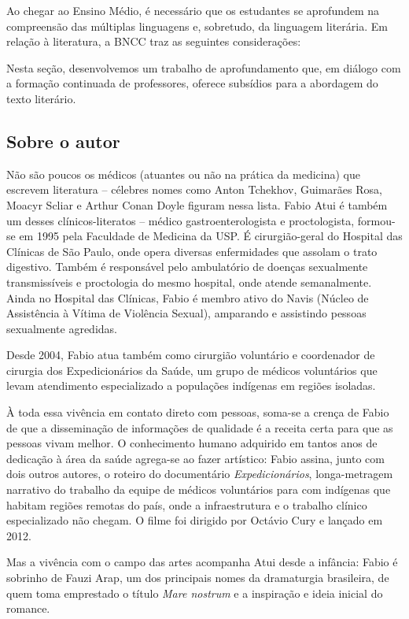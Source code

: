 \documentclass[12pt]{extarticle}
\begin{document}
Ao chegar ao Ensino Médio, é necessário que os estudantes se aprofundem na compreensão
das múltiplas linguagens e, sobretudo, da linguagem literária. Em relação à literatura, 
a BNCC traz as seguintes considerações:

Nesta seção, desenvolvemos um trabalho de aprofundamento que, em diálogo com a 
formação continuada de professores, oferece subsídios para a abordagem do texto literário.


\subsection{Sobre o autor}

Não são poucos os médicos (atuantes ou não na prática da medicina) que escrevem literatura – célebres nomes como Anton Tchekhov, Guimarães Rosa, Moacyr Scliar e Arthur Conan Doyle figuram nessa lista. Fabio Atui é também um desses clínicos-literatos – médico gastroenterologista e proctologista, formou-se em 1995 pela Faculdade de Medicina da USP. É cirurgião-geral do Hospital das Clínicas de São Paulo, onde opera diversas enfermidades que assolam o trato digestivo. Também é responsável pelo ambulatório de doenças sexualmente transmissíveis e proctologia do mesmo hospital, onde atende semanalmente. Ainda no Hospital das Clínicas, Fabio é membro ativo do Navis (Núcleo de Assistência à Vítima de Violência Sexual), amparando e assistindo pessoas sexualmente agredidas.

Desde 2004, Fabio atua também como cirurgião voluntário e coordenador de cirurgia dos Expedicionários da Saúde, um grupo de médicos voluntários que levam atendimento especializado a populações indígenas em regiões isoladas. 




À toda essa vivência em contato direto com pessoas, soma-se a crença de Fabio de que a disseminação de informações de qualidade é a receita certa para que as pessoas vivam melhor. O conhecimento humano adquirido em tantos anos de dedicação à área da saúde agrega-se ao fazer artístico: Fabio assina, junto com dois outros autores, o roteiro do documentário \emph{Expedicionários}, longa-metragem narrativo do trabalho da equipe de médicos voluntários para com indígenas que habitam regiões remotas do país, onde a infraestrutura e o trabalho clínico especializado não chegam. O filme foi dirigido por Octávio Cury e lançado em 2012. 

Mas a vivência com o campo das artes acompanha Atui desde a infância: Fabio é sobrinho de Fauzi Arap, um dos principais nomes da dramaturgia brasileira, de quem toma emprestado o título \emph{Mare nostrum} e a inspiração e ideia inicial do romance.
\end{document}
